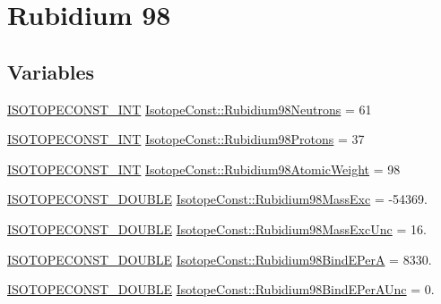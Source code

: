 \hypertarget{group___isotope_const-_rubidium-_rb98}{}\section{Rubidium 98}
\label{group___isotope_const-_rubidium-_rb98}
\subsection*{Variables}
\begin{DoxyCompactItemize}
\item 
\mbox{\hyperlink{group___isotope_const-_macros_ga5f18360b3e99483a35c32d789e62621c}{I\+S\+O\+T\+O\+P\+E\+C\+O\+N\+S\+T\+\_\+\+I\+NT}} \mbox{\hyperlink{group___isotope_const-_rubidium-_rb98_ga18896eee0d5125f95b9f6e35dbf852d0}{Isotope\+Const\+::\+Rubidium98\+Neutrons}} = 61
\item 
\mbox{\hyperlink{group___isotope_const-_macros_ga5f18360b3e99483a35c32d789e62621c}{I\+S\+O\+T\+O\+P\+E\+C\+O\+N\+S\+T\+\_\+\+I\+NT}} \mbox{\hyperlink{group___isotope_const-_rubidium-_rb98_gaa921134626a42b00974c78fd82a9dc16}{Isotope\+Const\+::\+Rubidium98\+Protons}} = 37
\item 
\mbox{\hyperlink{group___isotope_const-_macros_ga5f18360b3e99483a35c32d789e62621c}{I\+S\+O\+T\+O\+P\+E\+C\+O\+N\+S\+T\+\_\+\+I\+NT}} \mbox{\hyperlink{group___isotope_const-_rubidium-_rb98_ga1569a0c394f855620b03ae0b3e708c9c}{Isotope\+Const\+::\+Rubidium98\+Atomic\+Weight}} = 98
\item 
\mbox{\hyperlink{group___isotope_const-_macros_ga8f45a7272ce02c0b4c65c44636ed719a}{I\+S\+O\+T\+O\+P\+E\+C\+O\+N\+S\+T\+\_\+\+D\+O\+U\+B\+LE}} \mbox{\hyperlink{group___isotope_const-_rubidium-_rb98_ga3ae3538e2866af5515e21855f0f4daed}{Isotope\+Const\+::\+Rubidium98\+Mass\+Exc}} = -\/54369.
\item 
\mbox{\hyperlink{group___isotope_const-_macros_ga8f45a7272ce02c0b4c65c44636ed719a}{I\+S\+O\+T\+O\+P\+E\+C\+O\+N\+S\+T\+\_\+\+D\+O\+U\+B\+LE}} \mbox{\hyperlink{group___isotope_const-_rubidium-_rb98_ga243c9ea1ffb2d3c5d03ef82fe7d16010}{Isotope\+Const\+::\+Rubidium98\+Mass\+Exc\+Unc}} = 16.
\item 
\mbox{\hyperlink{group___isotope_const-_macros_ga8f45a7272ce02c0b4c65c44636ed719a}{I\+S\+O\+T\+O\+P\+E\+C\+O\+N\+S\+T\+\_\+\+D\+O\+U\+B\+LE}} \mbox{\hyperlink{group___isotope_const-_rubidium-_rb98_ga341e9c8b9a782a81085c58371df45198}{Isotope\+Const\+::\+Rubidium98\+Bind\+E\+PerA}} = 8330.
\item 
\mbox{\hyperlink{group___isotope_const-_macros_ga8f45a7272ce02c0b4c65c44636ed719a}{I\+S\+O\+T\+O\+P\+E\+C\+O\+N\+S\+T\+\_\+\+D\+O\+U\+B\+LE}} \mbox{\hyperlink{group___isotope_const-_rubidium-_rb98_gab54ae92fa19f4f45d9613a7df9319ec6}{Isotope\+Const\+::\+Rubidium98\+Bind\+E\+Per\+A\+Unc}} = 0.

\end{DoxyCompactItemize}
